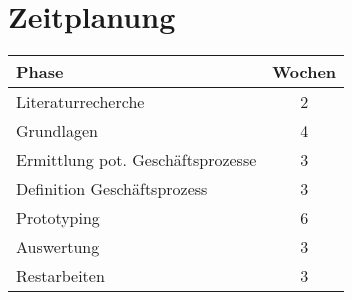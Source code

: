 \section{Zeitplanung}
\begin{centering}
	\begin{tabular}{|l|c|}
		\hline 
		Phase & Wochen \\ 
		\hline 
		Literaturrecherche & 2 \\ 
		\hline 
		Grundlagen & 4 \\ 
		\hline 
		Ermittlung pot. Geschäftsprozesse & 3 \\ 
		\hline 
		Definition Geschäftsprozess & 3 \\ 
		\hline 
		Prototyping & 6 \\ 
		\hline 
		Auswertung & 3 \\ 
		\hline 
		Restarbeiten & 3 \\ 
		\hline 
	\end{tabular} 
\end{centering}
\newpage